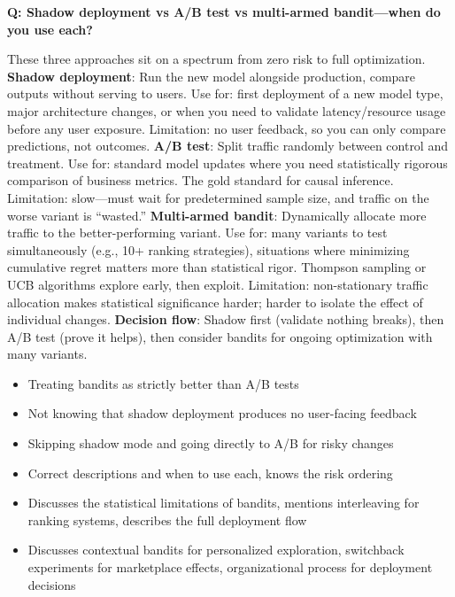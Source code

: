 \begin{interviewq}
\textbf{Q: Shadow deployment vs A/B test vs multi-armed bandit---when do you use each?}

 \quad {} \quad \badgefreq{\freqhigh}

\stronganswer These three approaches sit on a spectrum from zero risk to full optimization. \textbf{Shadow deployment}: Run the new model alongside production, compare outputs without serving to users. Use for: first deployment of a new model type, major architecture changes, or when you need to validate latency/resource usage before any user exposure. Limitation: no user feedback, so you can only compare predictions, not outcomes. \textbf{A/B test}: Split traffic randomly between control and treatment. Use for: standard model updates where you need statistically rigorous comparison of business metrics. The gold standard for causal inference. Limitation: slow---must wait for predetermined sample size, and traffic on the worse variant is ``wasted.'' \textbf{Multi-armed bandit}: Dynamically allocate more traffic to the better-performing variant. Use for: many variants to test simultaneously (e.g., 10+ ranking strategies), situations where minimizing cumulative regret matters more than statistical rigor. Thompson sampling or UCB algorithms explore early, then exploit. Limitation: non-stationary traffic allocation makes statistical significance harder; harder to isolate the effect of individual changes. \textbf{Decision flow}: Shadow first (validate nothing breaks), then A/B test (prove it helps), then consider bandits for ongoing optimization with many variants.

\redflags
\begin{itemize}
    \item Treating bandits as strictly better than A/B tests
    \item Not knowing that shadow deployment produces no user-facing feedback
    \item Skipping shadow mode and going directly to A/B for risky changes
\end{itemize}


\goodgreat
\begin{itemize}
    \item {} Correct descriptions and when to use each, knows the risk ordering
    \item {} Discusses the statistical limitations of bandits, mentions interleaving for ranking systems, describes the full deployment flow
    \item {} Discusses contextual bandits for personalized exploration, switchback experiments for marketplace effects, organizational process for deployment decisions
\end{itemize}

\end{interviewq}


